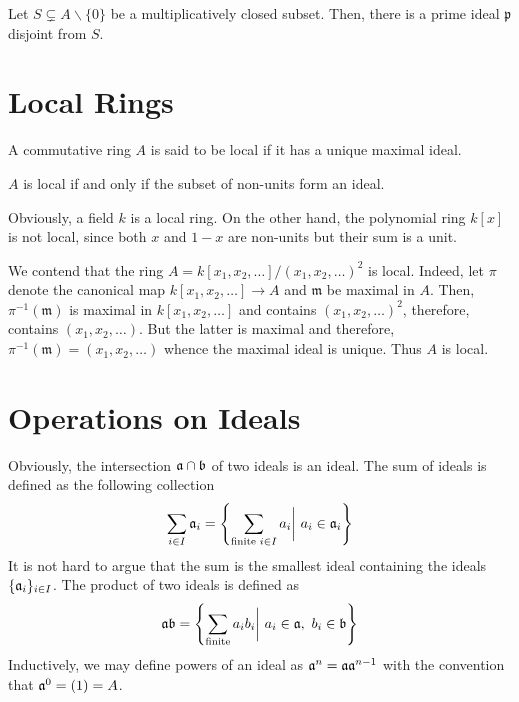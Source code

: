 \begin{proposition}
    Let $S\subsetneq A\backslash\{0\}$ be a multiplicatively closed subset. Then, there is a prime ideal $\mathfrak p$ disjoint from $S$.
\end{proposition}

\section{Local Rings}
\begin{definition}
    A commutative ring $A$ is said to be local if it has a unique maximal ideal.
\end{definition}

\begin{proposition}
    $A$ is local if and only if the subset of non-units form an ideal.
\end{proposition}

Obviously, a field $k$ is a local ring. On the other hand, the polynomial ring $k[x]$ is not local, since both $x$ and $1 - x$ are non-units but their sum is a unit. 

We contend that the ring $A = k[x_1,x_2,\ldots]/(x_1,x_2,\ldots)^2$ is local. Indeed, let $\pi$ denote the canonical map $k[x_1,x_2,\ldots]\to A$ and $\mathfrak m$ be maximal in $A$. Then, $\pi^{-1}(\mathfrak m)$ is maximal in $k[x_1,x_2,\ldots]$ and contains $(x_1,x_2,\ldots)^2$, therefore, contains $(x_1,x_2,\ldots)$. But the latter is maximal and therefore, $\pi^{-1}(\mathfrak m) = (x_1,x_2,\ldots)$ whence the maximal ideal is unique. Thus $A$ is local.


\section{Operations on Ideals}

Obviously, the intersection $\mathfrak a\cap\mathfrak b$ of two ideals is an ideal. The sum of ideals is defined as the following collection
\begin{equation*}
    \sum_{i\in I}\mathfrak a_i = \left\{\sum_{\text{finite }i\in I}a_i\bigg\vert~a_i\in\mathfrak a_i\right\}
\end{equation*}
It is not hard to argue that the sum is the smallest ideal containing the ideals $\{\mathfrak a_i\}_{i\in I}$. The product of two ideals is defined as 
\begin{equation*}
    \mathfrak a\mathfrak b = \left\{\sum_{\text{finite}}a_ib_i\bigg\vert~a_i\in\mathfrak a,~b_i\in\mathfrak b\right\}
\end{equation*}
Inductively, we may define powers of an ideal as $\mathfrak a^n = \mathfrak a\mathfrak a^{n - 1}$ with the convention that $\mathfrak a^0 = (1) = A$.

